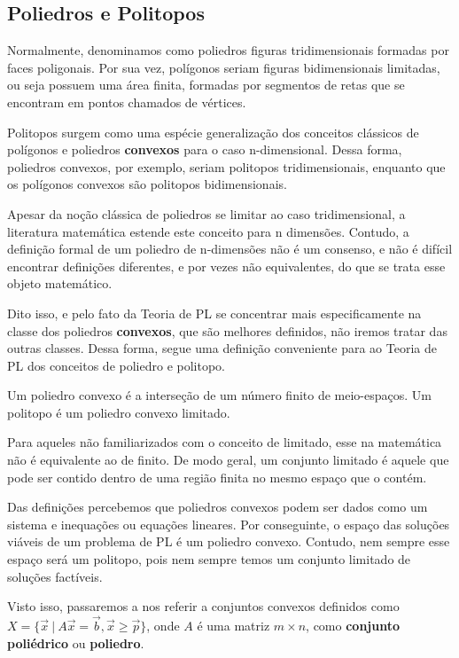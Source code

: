 \subsection{Poliedros e Politopos}
Normalmente, denominamos como poliedros figuras tridimensionais
formadas por faces poligonais. Por sua vez, polígonos seriam figuras bidimensionais
limitadas, ou seja possuem uma área finita, formadas por segmentos de retas que se
encontram em pontos chamados de vértices.

Politopos surgem como uma espécie generalização dos conceitos clássicos de polígonos
e poliedros \textbf{convexos} para o caso n-dimensional. Dessa forma, poliedros
convexos, por exemplo, seriam politopos tridimensionais, enquanto que os polígonos
convexos são politopos bidimensionais.

Apesar da noção clássica de poliedros se limitar ao caso tridimensional, a
literatura matemática estende este conceito para n dimensões. Contudo, a definição
formal de um poliedro de n-dimensões não é um consenso, e não é difícil encontrar
definições diferentes, e por vezes não equivalentes, do que se trata esse objeto
matemático.

Dito isso, e pelo fato da Teoria de PL se concentrar mais especificamente na classe
dos poliedros \textbf{convexos}, que são melhores definidos, não iremos tratar das
outras classes. Dessa forma, segue uma definição conveniente para ao Teoria de PL
dos conceitos de poliedro e politopo.

\begin{def:poliedro convexo}
	Um poliedro convexo é a interseção de um número finito de meio-espaços.
	Um politopo é um poliedro convexo limitado.
\end{def:poliedro convexo}

Para aqueles não familiarizados com o conceito de limitado, esse na matemática não é equivalente
ao de finito. De modo geral, um conjunto limitado é aquele que pode ser contido
dentro de uma região finita no mesmo espaço que o contém.

Das definições percebemos que poliedros convexos podem ser dados como um sistema
e inequações ou equações lineares. Por conseguinte, o espaço das soluções viáveis
de um problema de PL é um poliedro convexo. Contudo, nem sempre esse espaço
será um politopo, pois nem sempre temos um conjunto limitado de soluções factíveis.

Visto isso, passaremos a nos referir a conjuntos convexos definidos como
$X = \{\vec{x}\ |\ A\vec{x} = \vec{b}, \vec{x} \geq \vec{p}\}$, onde $A$ é uma
matriz $m \times n$, como \textbf{conjunto poliédrico} ou \textbf{poliedro}.

